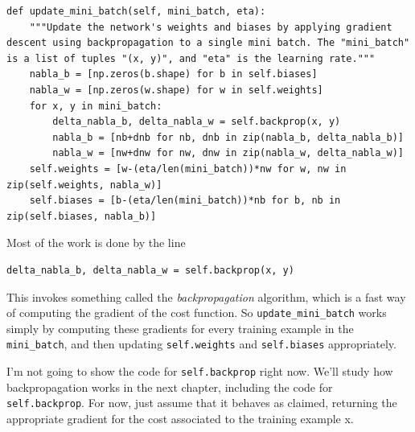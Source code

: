 \documentclass[a4paper,twoside,10pt]{book}
\begin{document}
\begin{lstlisting}
def update_mini_batch(self, mini_batch, eta):
	"""Update the network's weights and biases by applying gradient descent using backpropagation to a single mini batch. The "mini_batch" is a list of tuples "(x, y)", and "eta" is the learning rate."""
	nabla_b = [np.zeros(b.shape) for b in self.biases]
	nabla_w = [np.zeros(w.shape) for w in self.weights]
	for x, y in mini_batch:
		delta_nabla_b, delta_nabla_w = self.backprop(x, y)
		nabla_b = [nb+dnb for nb, dnb in zip(nabla_b, delta_nabla_b)]
		nabla_w = [nw+dnw for nw, dnw in zip(nabla_w, delta_nabla_w)]
	self.weights = [w-(eta/len(mini_batch))*nw for w, nw in zip(self.weights, nabla_w)]
	self.biases = [b-(eta/len(mini_batch))*nb for b, nb in zip(self.biases, nabla_b)]
\end{lstlisting}

Most of the work is done by the line
\begin{lstlisting}
delta_nabla_b, delta_nabla_w = self.backprop(x, y)
\end{lstlisting}
This invokes something called the \textit{backpropagation} algorithm, which is a fast way of computing the gradient of the cost function. So  \texttt{update\_mini\_batch} works simply by computing these gradients for every training example in the \texttt{mini\_batch}, and then updating \texttt{self.weights} and \texttt{self.biases} appropriately.

I'm not going to show the code for \texttt{self.backprop} right now. We'll study how backpropagation works in the next chapter, including the code for \texttt{self.backprop}. For now, just assume that it behaves as claimed, returning the appropriate gradient for the cost associated to the training example x.
\end{document}
